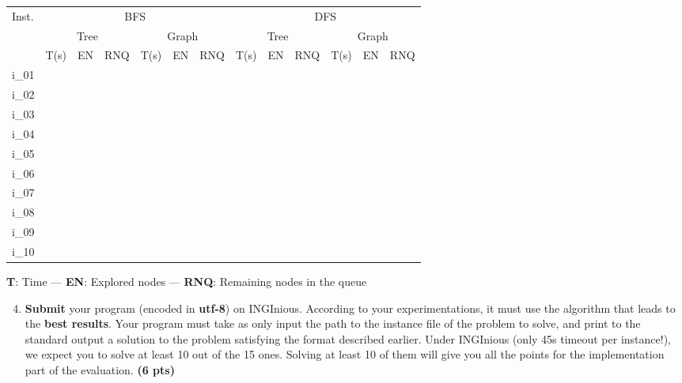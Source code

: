 \documentclass[11pt,a4paper]{report}
\begin{document}
\begin{answers}[7cm]
\small
\begin{center}
\begin{tabular}{||l|l|l|l|l|l|l|l|l|l|l|l|l||}
\hline
\multirow{3}{*}{Inst.} & \multicolumn{6}{c|}{BFS} & \multicolumn{6}{c||}{DFS} \\
\cline{2-13}
& \multicolumn{3}{c|}{Tree} & \multicolumn{3}{c|}{Graph} & \multicolumn{3}{c|}{Tree} & \multicolumn{3}{c||}{Graph}\\
\cline{2-13}
 & T(s) & EN & RNQ & T(s) & EN & RNQ & T(s) & EN & RNQ & T(s) & EN & RNQ\\
\hline
i\_01 & & & & & & & & & & & & \\
\hline
i\_02 & & & & & & & & & & & & \\
\hline
i\_03 & & & & & & & & & & & & \\
\hline
i\_04 & & & & & & & & & & & & \\
\hline
i\_05 & & & & & & & & & & & & \\
\hline
i\_06 & & & & & & & & & & & & \\
\hline
i\_07 & & & & & & & & & & & & \\
\hline
i\_08 & & & & & & & & & & & & \\
\hline
i\_09 & & & & & & & & & & & & \\
\hline
i\_10 & & & & & & & & & & & & \\
\hline
\end{tabular}
\end{center}
\textbf{T}: Time — \textbf{EN}: Explored nodes —
\textbf{RNQ}: Remaining nodes in the queue
\end{answers}



\begin{enumerate}
\setcounter{enumi}{3}
    \item\textbf{Submit} your program (encoded in \textbf{utf-8}) on INGInious.
    According to your experimentations, it must use the algorithm that leads to the \textbf{best results}.
    Your program must take as only input the path to the instance file of the problem to solve, and print to the standard output a solution to the problem satisfying the format described earlier. %
    Under INGInious (only 45s timeout per instance!), we expect you to solve at least 10 out of the 15 ones. Solving at least 10 of them will give you all the points for the implementation part of the evaluation. \textbf{(6 pts)}
\end{enumerate}
\end{document}
